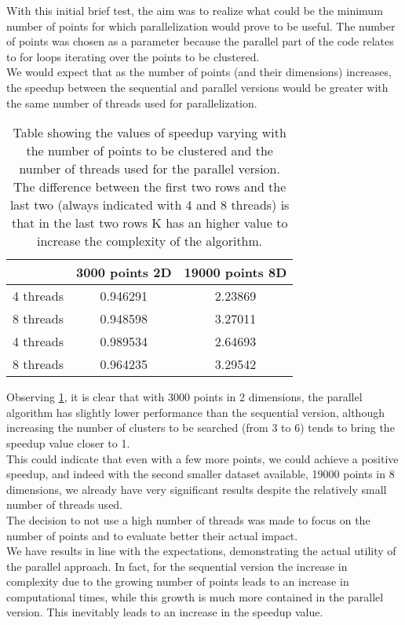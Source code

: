 \documentclass[10pt,twocolumn,letterpaper]{article}
\begin{document}
With this initial brief test, the aim was to realize what could be the minimum number of points for which parallelization would prove to be useful. The number of points was chosen as a parameter because the parallel part of the code relates to for loops iterating over the points to be clustered.\\
We would expect that as the number of points (and their dimensions) increases, the speedup between the sequential and parallel versions would be greater with the same number of threads used for parallelization.

\begin{table}[h]
\centering
\begin{tabular}{ |c|c|c| } 
\hline
 & 3000 points 2D & 19000 points 8D \\
\hline
4 threads & 0.946291 & 2.23869\\
\hline
8 threads & 0.948598 & 3.27011\\
\hline
4 threads & 0.989534 & 2.64693\\
\hline
8 threads & 0.964235 & 3.29542\\
\hline
\end{tabular}
\vspace*{3mm}
\caption{Table showing the values of speedup varying with the number of points to be clustered and the number of threads used for the parallel version. The difference between the first two rows and the last two (always indicated with 4 and 8 threads) is that in the last two rows K has an higher value to increase the complexity of the algorithm.}
\label{table:t1}
\end{table}

Observing \cref{table:t1}, it is clear that with 3000 points in 2 dimensions, the parallel algorithm has slightly lower performance than the sequential version, although increasing the number of clusters to be searched (from 3 to 6) tends to bring the speedup value closer to 1.\\
This could indicate that even with a few more points, we could achieve a positive speedup, and indeed with the second smaller dataset available, 19000 points in 8 dimensions, we already have very significant results despite the relatively small number of threads used.\\
The decision to not use a high number of threads was made to focus on the number of points and to evaluate better their actual impact.\\
We have results in line with the expectations, demonstrating the actual utility of the parallel approach. In fact, for the sequential version the increase in complexity due to the growing number of points leads to an increase in computational times, while this growth is much more contained in the parallel version. This inevitably leads to an increase in the speedup value.
\end{document}
